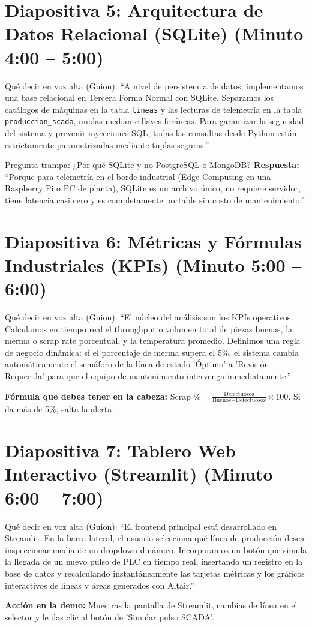 \documentclass[10pt,letterpaper]{article}
\begin{document}
\newpage

\section*{Diapositiva 5: Arquitectura de Datos Relacional (SQLite) (Minuto 4:00 -- 5:00)}
\begin{guionbox}{Qué decir en voz alta (Guion):}
``A nivel de persistencia de datos, implementamos una base relacional en Tercera Forma Normal con SQLite. Separamos los catálogos de máquinas en la tabla \texttt{lineas} y las lecturas de telemetría en la tabla \texttt{produccion\_scada}, unidas mediante llaves foráneas. Para garantizar la seguridad del sistema y prevenir inyecciones SQL, todas las consultas desde Python están estrictamente parametrizadas mediante tuplas seguras.''
\end{guionbox}
\begin{trampa}{Pregunta trampa: ¿Por qué SQLite y no PostgreSQL o MongoDB?}
\textbf{Respuesta:} ``Porque para telemetría en el borde industrial (Edge Computing en una Raspberry Pi o PC de planta), SQLite es un archivo único, no requiere servidor, tiene latencia casi cero y es completamente portable sin costo de mantenimiento.''
\end{trampa}

\section*{Diapositiva 6: Métricas y Fórmulas Industriales (KPIs) (Minuto 5:00 -- 6:00)}
\begin{guionbox}{Qué decir en voz alta (Guion):}
``El núcleo del análisis son los KPIs operativos. Calculamos en tiempo real el throughput o volumen total de piezas buenas, la merma o scrap rate porcentual, y la temperatura promedio. Definimos una regla de negocio dinámica: si el porcentaje de merma supera el 5\%, el sistema cambia automáticamente el semáforo de la línea de estado 'Óptimo' a 'Revisión Requerida' para que el equipo de mantenimiento intervenga inmediatamente.''
\end{guionbox}
\textbf{Fórmula que debes tener en la cabeza:} $\text{Scrap } \% = \frac{\text{Defectuosos}}{\text{Buenos} + \text{Defectuosos}} \times 100$. Si da más de 5\%, salta la alerta.

\section*{Diapositiva 7: Tablero Web Interactivo (Streamlit) (Minuto 6:00 -- 7:00)}
\begin{guionbox}{Qué decir en voz alta (Guion):}
``El frontend principal está desarrollado en Streamlit. En la barra lateral, el usuario selecciona qué línea de producción desea inspeccionar mediante un dropdown dinámico. Incorporamos un botón que simula la llegada de un nuevo pulso de PLC en tiempo real, insertando un registro en la base de datos y recalculando instantáneamente las tarjetas métricas y los gráficos interactivos de líneas y áreas generados con Altair.''
\end{guionbox}
\textbf{Acción en la demo:} Muestras la pantalla de Streamlit, cambias de línea en el selector y le das clic al botón de 'Simular pulso SCADA'.
\end{document}
